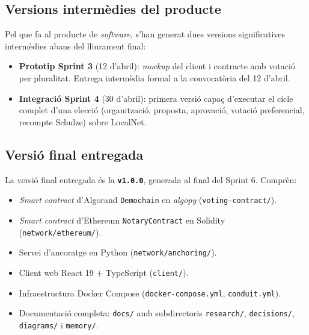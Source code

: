 \subsection{Versions intermèdies del producte}
\label{subsec:versions-intermedies-del-producte}

Pel que fa al producte de \textit{software}, s'han generat dues versions significatives intermèdies abans del lliurament final:

\begin{itemize}
    \item \textbf{Prototip Sprint 3} (12 d'abril): \emph{mockup} del client i contracte amb votació per pluralitat.
    Entrega intermèdia formal a la convocatòria del 12 d'abril.

    \item \textbf{Integració Sprint 4} (30 d'abril): primera versió capaç d'executar el cicle complet d'una elecció
    (organització, proposta, aprovació, votació preferencial, recompte Schulze) sobre LocalNet.
\end{itemize}

\subsection{Versió final entregada}
\label{subsec:versio-final-entregada}

La versió final entregada és la \textbf{\texttt{v1.0.0}}, generada al final del Sprint 6.
Comprèn:

\begin{itemize}
    \item \emph{Smart contract} d'Algorand \texttt{Demochain} en \emph{algopy} (\texttt{voting-contract/}).

    \item \emph{Smart contract} d'Ethereum \texttt{NotaryContract} en Solidity (\texttt{network/ethereum/}).

    \item Servei d'ancoratge en Python (\texttt{network/anchoring/}).

    \item Client web React 19 + TypeScript (\texttt{client/}).

    \item Infraestructura Docker Compose (\texttt{docker-compose.yml}, \texttt{conduit.yml}).

    \item Documentació completa: \texttt{docs/} amb subdirectoris \texttt{research/}, \texttt{decisions/},
    \texttt{diagrams/} i \texttt{memory/}.
\end{itemize}

